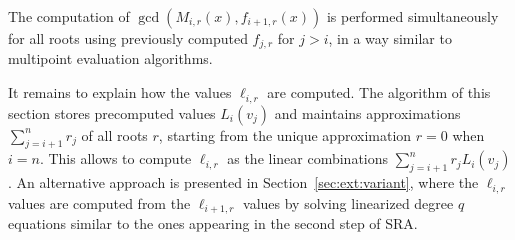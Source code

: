 \documentclass{sig-alternate}
\newcounter{algo}
\begin{document}
The computation of $\gcd(M_{i,r}(x),f_{i+1,r}(x))$ is performed simultaneously for all roots using previously computed $f_{j,r}$ for $j>i$, in a way similar to multipoint evaluation algorithms.

It remains to explain how the values $\ell_{i,r}$ are computed.
The algorithm of this section stores precomputed values $L_i(v_{j})$ and maintains approximations $\sum_{j=i+1}^nr_j$ of all roots $r$, starting from the unique approximation $r=0$ when $i=n$. 
This allows to compute $\ell_{i,r}$ as the linear combinations $\sum_{j=i+1}^nr_jL_i(v_{j})$. 
An alternative approach is presented in Section~\ref{sec:ext:variant}, where the $\ell_{i,r}$ values are computed from the $\ell_{i+1,r}$ values by solving linearized degree $q$ equations similar to the ones appearing in the second step of SRA.
\end{document}
